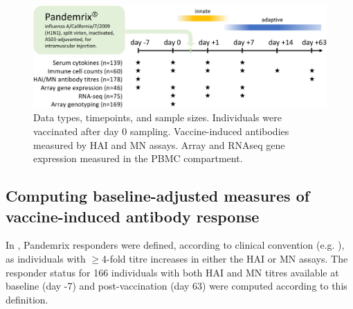 \begin{figure}
    \includegraphics[width=1.0\textwidth]{mainmatter/figures/chapter_02/graphics_ashg19/hird_design-crop.pdf}
    \caption{Data types, timepoints, and sample sizes. Individuals were vaccinated after day 0 sampling. Vaccine-induced antibodies measured by \gls{HAI} and \gls{MN} assays. Array and \gls{RNAseq} gene expression measured in the \gls{PBMC} compartment.}
    \label{fig:hird_design}
\end{figure}

\subsection{Computing baseline-adjusted measures of vaccine-induced antibody response}

In \autocite{sobolev2016AdjuvantedInfluenzaH1N1Vaccination}, Pandemrix responders were defined, according to clinical convention (e.g. \autocite{foodanddrugadministration2007GuidanceIndustryClinical}), as individuals with $\ge$4-fold titre increases in either the \gls{HAI} or \gls{MN} assays.
The responder status for 166 individuals with both \gls{HAI} and \gls{MN} titres available at baseline (day -7) and post-vaccination (day 63) were computed according to this definition.

